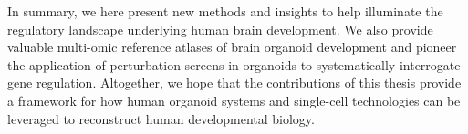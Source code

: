 In summary, we here present new methods and insights to help illuminate the regulatory landscape underlying human brain development. We also provide valuable multi-omic reference atlases of brain organoid development and pioneer the application of perturbation screens in organoids to systematically interrogate gene regulation. Altogether, we hope that the contributions of this thesis provide a framework for how human organoid systems and single-cell technologies can be leveraged to reconstruct human developmental biology.


